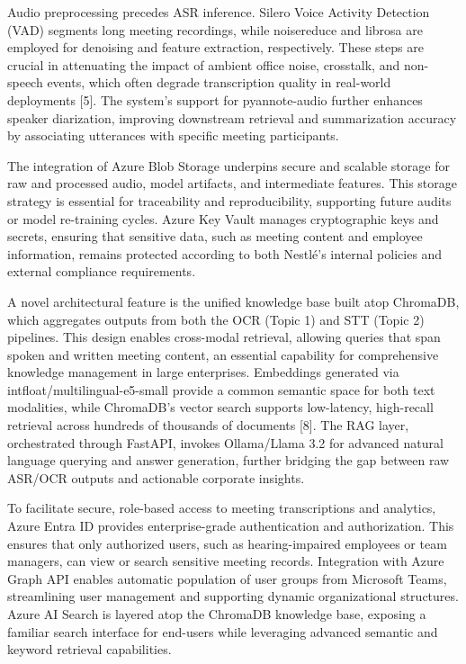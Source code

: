 \documentclass[12pt,a4paper]{article}
\begin{document}
Audio preprocessing precedes ASR inference. Silero Voice Activity Detection (VAD) segments long meeting recordings, while noisereduce and librosa are employed for denoising and feature extraction, respectively. These steps are crucial in attenuating the impact of ambient office noise, crosstalk, and non-speech events, which often degrade transcription quality in real-world deployments [5]. The system’s support for pyannote-audio further enhances speaker diarization, improving downstream retrieval and summarization accuracy by associating utterances with specific meeting participants.


The integration of Azure Blob Storage underpins secure and scalable storage for raw and processed audio, model artifacts, and intermediate features. This storage strategy is essential for traceability and reproducibility, supporting future audits or model re-training cycles. Azure Key Vault manages cryptographic keys and secrets, ensuring that sensitive data, such as meeting content and employee information, remains protected according to both Nestlé’s internal policies and external compliance requirements.


A novel architectural feature is the unified knowledge base built atop ChromaDB, which aggregates outputs from both the OCR (Topic 1) and STT (Topic 2) pipelines. This design enables cross-modal retrieval, allowing queries that span spoken and written meeting content, an essential capability for comprehensive knowledge management in large enterprises. Embeddings generated via intfloat/multilingual-e5-small provide a common semantic space for both text modalities, while ChromaDB’s vector search supports low-latency, high-recall retrieval across hundreds of thousands of documents [8]. The RAG layer, orchestrated through FastAPI, invokes Ollama/Llama 3.2 for advanced natural language querying and answer generation, further bridging the gap between raw ASR/OCR outputs and actionable corporate insights.


To facilitate secure, role-based access to meeting transcriptions and analytics, Azure Entra ID provides enterprise-grade authentication and authorization. This ensures that only authorized users, such as hearing-impaired employees or team managers, can view or search sensitive meeting records. Integration with Azure Graph API enables automatic population of user groups from Microsoft Teams, streamlining user management and supporting dynamic organizational structures. Azure AI Search is layered atop the ChromaDB knowledge base, exposing a familiar search interface for end-users while leveraging advanced semantic and keyword retrieval capabilities.
\end{document}
